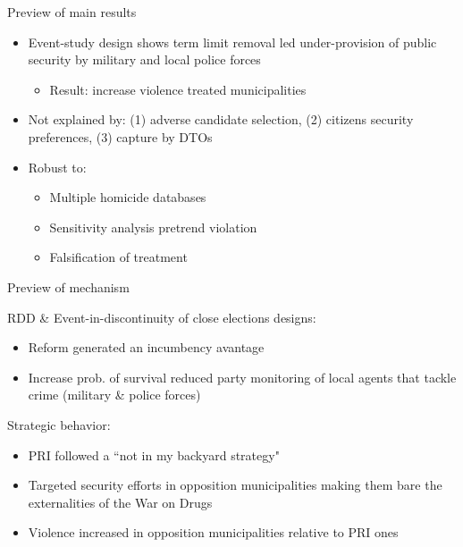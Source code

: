 \documentclass{beamer}
\begin{document}
\begin{frame}[label=preview]{Preview of main results}

\begin{itemize}
 		  \setlength\itemsep{1em} 

	\item Event-study design shows term limit removal led under-provision of public security by military and local police forces
		\begin{itemize}
			\item \alert{Result: increase violence treated municipalities}
		\end{itemize}

	\item Not explained by: (1) adverse candidate selection, (2) citizens security preferences, (3) capture by DTOs
	\item Robust to:
		\begin{itemize}
		\item Multiple homicide databases
		\item Sensitivity analysis pretrend violation
		\item Falsification of treatment
		\end{itemize}
\end{itemize}
	
\end{frame} 
\begin{frame}[label=preview_mechanisms]{Preview of mechanism}

RDD \& Event-in-discontinuity of close elections designs: 
\begin{itemize}
	\item Reform generated an incumbency avantage
	\item Increase prob. of survival reduced party monitoring of local agents that tackle crime (military \& police forces)
\end{itemize}
\bigskip
Strategic behavior:
\begin{itemize}
	\item PRI followed a ``not in my backyard strategy"
	\item Targeted security efforts in opposition municipalities making them bare the externalities of the War on Drugs
	\item Violence increased in opposition municipalities relative to PRI ones
\end{itemize}
\bigskip
 
\end{frame} 
\end{document}
